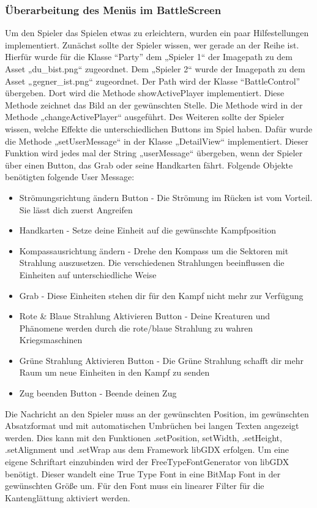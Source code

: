 \subsubsection{Überarbeitung des Menüs im BattleScreen}
Um den Spieler das Spielen etwas zu erleichtern, wurden ein paar Hilfestellungen implementiert. Zunächst sollte der Spieler wissen, wer gerade an der Reihe ist. Hierfür wurde für die Klasse “Party” dem  „Spieler 1“ der Imagepath zu dem Asset „du\_bist.png“ zugeordnet. Dem „Spieler 2“ wurde der Imagepath zu dem Asset „gegner\_ist.png“ zugeordnet. Der Path wird der Klasse “BattleControl” übergeben. Dort wird die Methode showActivePlayer implementiert. Diese Methode zeichnet das Bild an der gewünschten Stelle. Die Methode wird in der Methode „changeActivePlayer“ ausgeführt.
Des Weiteren sollte der Spieler wissen, welche Effekte die unterschiedlichen Buttons im Spiel haben. Dafür wurde die Methode „setUserMessage“ in der Klasse „DetailView“ implementiert. Dieser Funktion wird jedes mal der String „userMessage“ übergeben, wenn der Spieler über einen Button, das Grab oder seine Handkarten fährt.
Folgende Objekte benötigten folgende User Message:
\begin{itemize}
\item Strömungsrichtung ändern Button - Die Strömung im Rücken ist vom Vorteil. Sie lässt dich zuerst Angreifen
\item Handkarten - Setze deine Einheit auf die gewünschte Kampfposition
\item Kompassausrichtung ändern - Drehe den Kompass um die Sektoren mit Strahlung auszusetzen. Die verschiedenen Strahlungen beeinflussen die Einheiten auf unterschiedliche Weise
\item Grab - Diese Einheiten stehen dir für den Kampf nicht mehr zur Verfügung
\item Rote  \& Blaue Strahlung Aktivieren Button - Deine Kreaturen und Phänomene werden durch die rote/blaue Strahlung zu wahren Kriegsmaschinen
\item Grüne Strahlung Aktivieren Button - Die Grüne Strahlung schafft dir mehr Raum um neue Einheiten in den Kampf zu senden
\item Zug beenden Button - Beende deinen Zug
\end{itemize}

Die Nachricht an den Spieler muss an der gewünschten Position, im gewünschten Absatzformat und mit automatischen Umbrüchen bei langen Texten angezeigt werden. Dies kann mit den Funktionen .setPosition, setWidth, .setHeight, .setAlignment und .setWrap aus dem Framework libGDX erfolgen. 
Um eine eigene Schriftart einzubinden wird der FreeTypeFontGenerator von libGDX benötigt. Dieser wandelt eine True Type Font in eine BitMap Font in der gewünschten Größe um. Für den Font muss ein linearer Filter für die Kantenglättung aktiviert werden.

